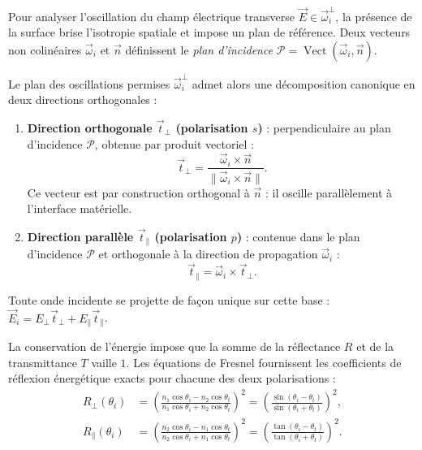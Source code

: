 \begin{proposition}
    Pour analyser l'oscillation du champ électrique transverse $\vec{E} \in \vec{\omega}_i^\perp$, la présence de la surface brise l'isotropie spatiale et impose un plan de référence. Deux vecteurs non colinéaires $\vec{\omega}_i$ et $\vec{n}$ définissent le \emph{plan d'incidence} $\mathcal{P} = \operatorname{Vect}(\vec{\omega}_i, \vec{n})$.

    Le plan des oscillations permises $\vec{\omega}_i^\perp$ admet alors une décomposition canonique en deux directions orthogonales :
    \begin{enumerate}
        \item \textbf{Direction orthogonale $\vec{t}_\perp$ (polarisation $s$)} : perpendiculaire au plan d'incidence $\mathcal{P}$, obtenue par produit vectoriel :
        \begin{equation}
            \vec{t}_\perp = \frac{\vec{\omega}_i \times \vec{n}}{\|\vec{\omega}_i \times \vec{n}\|}.
        \end{equation}
        Ce vecteur est par construction orthogonal à $\vec{n}$ : il oscille parallèlement à l'interface matérielle.
        \item \textbf{Direction parallèle $\vec{t}_\parallel$ (polarisation $p$)} : contenue dans le plan d'incidence $\mathcal{P}$ et orthogonale à la direction de propagation $\vec{\omega}_i$ :
        \begin{equation}
            \vec{t}_\parallel = \vec{\omega}_i \times \vec{t}_\perp.
        \end{equation}
    \end{enumerate}
    Toute onde incidente se projette de façon unique sur cette base : $\vec{E}_i = E_\perp \vec{t}_\perp + E_\parallel \vec{t}_\parallel$.
\end{proposition}

\begin{proposition}
    La conservation de l'énergie impose que la somme de la réflectance $R$ et de la transmittance $T$ vaille $1$. Les équations de Fresnel fournissent les coefficients de réflexion énergétique exacts pour chacune des deux polarisations :
    \begin{align}
        R_\perp(\theta_i) &= \left( \frac{n_1 \cos\theta_i - n_2 \cos\theta_t}{n_1 \cos\theta_i + n_2 \cos\theta_t} \right)^2 = \left( \frac{\sin(\theta_i - \theta_t)}{\sin(\theta_i + \theta_t)} \right)^2, \label{eq:fresnel_perp} \\
        R_\parallel(\theta_i) &= \left( \frac{n_2 \cos\theta_i - n_1 \cos\theta_t}{n_2 \cos\theta_i + n_1 \cos\theta_t} \right)^2 = \left( \frac{\tan(\theta_i - \theta_t)}{\tan(\theta_i + \theta_t)} \right)^2. \label{eq:fresnel_para}
    \end{align}
\end{proposition}

